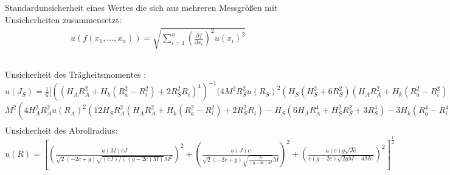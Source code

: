 Standardunsicherheit eines Wertes die sich aus mehreren Messgrößen mit Unsicherheiten zusammensetzt:
\begin{align}
	u(f(x_1,...,x_n))=\sqrt{\sum_{i=1}^{n}\left(\frac{\partial f}{\partial x_i}\right)^2 u(x_i)^2}
	\label{eq:suw}
\end{align}
\subsection*{}
Unsicherheit des Trägheitsmomentes :\\
$u( J_S)= \frac{1}{6} [ ((H_{A} R_{A}^{2} + H_{k} (R_{a}^{2} - R_{i}^{2}) + 2 R_{S}^{2} R_{i})^{4})^{-1} (4 M^{2} R_{S}^{2} u( R_{S})^{2} (H_{S} (H_{S}^{2} + 6 R_{S}^{2}) (H_{A} R_{A}^{2} + H_{k} (R_{a}^{2} - R_{i}^{2}) + 2 R_{S}^{2} R_{i}) - 2 R_{i} (H_{S} (6 H_{A} R_{A}^{4} + H_{S}^{2} R_{S}^{2} + 3 R_{S}^{4}) + 3 H_{k} (R_{a}^{4} - R_{i}^{4})))^{2} +$\\
$M^{2} (4 H_{A}^{2} R_{A}^{2} u(R_{A})^{2} (12 H_{S} R_{A}^{2} (H_{A} R_{A}^{2} + H_{k} (R_{a}^{2} - R_{i}^{2}) + 2 R_{S}^{2} R_{i}) - H_{S} (6 H_{A} R_{A}^{4} + H_{S}^{2} R_{S}^{2} + 3 R_{S}^{4}) - 3 H_{k} (R_{a}^{4} - R_{i}^{4}))^{2} + 4 H_{k}^{2} R_{a}^{2} u( R_{a})^{2} (- H_{S} (6 H_{A} R_{A}^{4} + H_{S}^{2} R_{S}^{2} + 3 R_{S}^{4}) - 3 H_{k} (R_{a}^{4} - R_{i}^{4}) + 6 R_{a}^{2} (H_{A} R_{A}^{2} + H_{k} (R_{a}^{2} - R_{i}^{2}) + 2 R_{S}^{2} R_{i}))^{2} + R_{A}^{4} u( H_{A})^{2} (6 H_{S} R_{A}^{2} (H_{A} R_{A}^{2} + H_{k} (R_{a}^{2} - R_{i}^{2}) + 2 R_{S}^{2} R_{i}) - H_{S}  (6 H_{A} R_{A}^{4} + H_{S}^{2} R_{S}^{2} + 3 R_{S}^{4} ) - 3 H_{k}  (R_{a}^{4} - R_{i}^{4} ) )^{2} + u( H_{k})^{2}  ( (R_{a}^{2} - R_{i}^{2} )  (H_{S}  (6 H_{A} R_{A}^{4} + H_{S}^{2} R_{S}^{2} + 3 R_{S}^{4} ) + 3 H_{k}  (R_{a}^{4} - R_{i}^{4} ) ) - 3  (R_{a}^{4} - R_{i}^{4} )  (H_{A} R_{A}^{2} + H_{k}  (R_{a}^{2} - R_{i}^{2} ) + 2 R_{S}^{2} R_{i} ) )^{2} + u( R_{i})^{2}  (12.0 H_{k} R_{i}^{3}  (H_{A} R_{A}^{2} + H_{k}  (R_{a}^{2} - R_{i}^{2} ) + 2 R_{S}^{2} R_{i} ) - 2  (H_{S}  (6 H_{A} R_{A}^{4} + H_{S}^{2} R_{S}^{2} + 3 R_{S}^{4} ) + 3 H_{k}  (R_{a}^{4} - R_{i}^{4} ) )  (H_{k} R_{i} - R_{S}^{2} ) )^{2} ) +  (9 M^{2} u( H_{S})^{2}  (2 H_{A} R_{A}^{4} + H_{S}^{2} R_{S}^{2} + R_{S}^{4} )^{2} + u( M)^{2}  (H_{S}  (6 H_{A} R_{A}^{4} + H_{S}^{2} R_{S}^{2} + 3 R_{S}^{4} ) + 3 H_{k}  (R_{a}^{4} - R_{i}^{4} ) )^{2} )  (H_{A} R_{A}^{2} + H_{k}  (R_{a}^{2} - R_{i}^{2} ) + 2 R_{S}^{2} R_{i} )^{2} )  ]^{\frac{1}{2}} $
\begin{align}
\label{eq:uJfall}
\end{align}
Unsicherheit des Abrollradius:\\
$
u(R) =\left[ 
(\frac{u( M) c J}{\sqrt{2} (-2 c+g) \sqrt{(c J)/((g-2c) M)} M^2})^2
+(\frac{u( J) c}{\sqrt{2} (-2 c+g) \sqrt{\frac{J c}{(g-2c) M}} M})^2
+(\frac{u( c) g \sqrt{J c}}{ c (g-2 c)\sqrt{2 g M-4 M c}})^2 
\right]^{\frac{1}{2}}	
$
\begin{align}
	\label{eq:uR}
\end{align}







